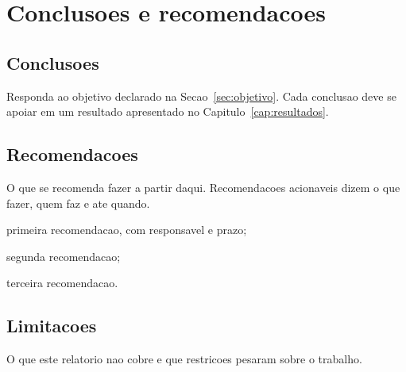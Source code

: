 \chapter{Conclusoes e recomendacoes}
\label{cap:conclusoes}

\section{Conclusoes}
\label{sec:conclusoes}

Responda ao objetivo declarado na Secao~\ref{sec:objetivo}. Cada conclusao deve
se apoiar em um resultado apresentado no Capitulo~\ref{cap:resultados}.

\section{Recomendacoes}
\label{sec:recomendacoes}

O que se recomenda fazer a partir daqui. Recomendacoes acionaveis dizem o que
fazer, quem faz e ate quando.

\begin{alineas}
  \item primeira recomendacao, com responsavel e prazo;
  \item segunda recomendacao;
  \item terceira recomendacao.
\end{alineas}

\section{Limitacoes}
\label{sec:limitacoes}

O que este relatorio nao cobre e que restricoes pesaram sobre o trabalho.
